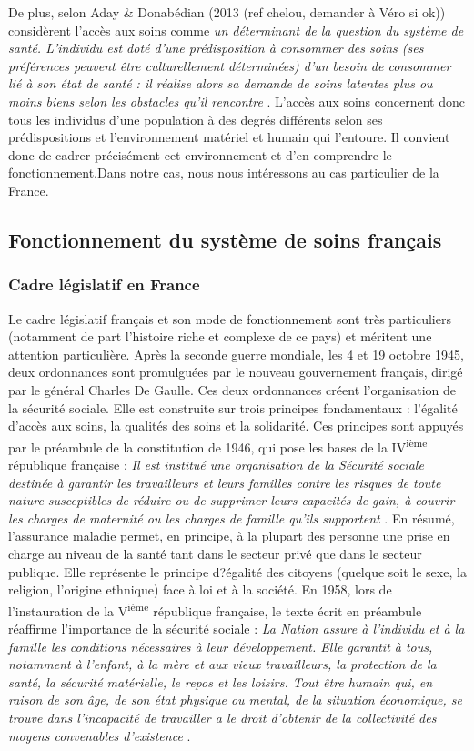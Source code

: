 De plus, selon Aday \& Donabédian (2013 (ref chelou, demander à Véro si ok)) \cite{DayDonabedian2005} considèrent l'accès aux soins comme \og \textit{un déterminant de la question du système de santé. L'individu est doté d'une prédisposition à consommer des soins (ses préférences peuvent être culturellement déterminées) d'un besoin de consommer lié à son état de santé : il réalise alors sa demande de soins latentes plus ou moins biens selon les obstacles qu'il rencontre} \fg{}. L'accès aux soins concernent donc tous les individus d'une population à des degrés différents selon ses prédispositions et l'environnement matériel et humain qui l'entoure. Il convient donc de cadrer précisément cet environnement et d'en comprendre le fonctionnement.Dans notre cas, nous nous intéressons au cas particulier de la France.


\subsection{Fonctionnement du système de soins français}
\subsubsection{Cadre législatif en France}

Le cadre législatif français et son mode de fonctionnement sont très particuliers (notamment de part l'histoire riche et complexe de ce pays) et méritent une attention particulière.
Après la seconde guerre mondiale, les 4 et 19 octobre 1945, deux ordonnances sont promulguées par le nouveau gouvernement français, dirigé par le général Charles De Gaulle. Ces deux ordonnances créent l'organisation de la sécurité sociale. Elle est construite sur trois principes fondamentaux : l'égalité d'accès aux soins, la qualités des soins et la solidarité. Ces principes sont appuyés par le préambule de la constitution de 1946, qui pose les bases de la IV\textsuperscript{ième} république française : \og \textit{Il est institué une organisation de la Sécurité sociale destinée à garantir les travailleurs et leurs familles contre les risques de toute nature susceptibles de réduire ou de supprimer leurs capacités de gain, à couvrir les charges de maternité ou les charges de famille qu'ils supportent} \fg . 
En résumé, l'assurance maladie permet, en principe, à la plupart des personne une prise en charge au niveau de la santé tant dans le secteur privé que dans le secteur publique. Elle représente le principe d?égalité des citoyens (quelque soit le sexe, la religion, l'origine ethnique) face à loi et à la société.
En 1958, lors de l'instauration de la V\textsuperscript{ième} république française, le texte écrit en préambule réaffirme l'importance de la sécurité sociale : \og \textit{La Nation assure à l'individu et à la famille les conditions nécessaires à leur développement. Elle garantit à tous, notamment à l'enfant, à la mère et aux vieux travailleurs, la protection de la santé, la sécurité matérielle, le repos et les loisirs. Tout être humain qui, en raison de son âge, de son état physique ou mental, de la situation économique, se trouve dans l'incapacité de travailler a le droit d'obtenir de la collectivité des moyens convenables d'existence}\fg{} .

